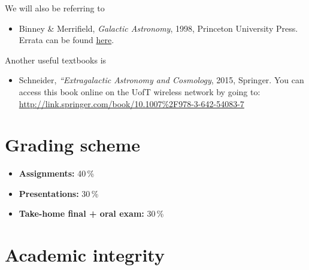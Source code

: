 \documentclass{article}
\begin{document}
We will also be referring to

\begin{itemize}

  \item Binney \& Merrifield, \emph{Galactic Astronomy},
    1998, Princeton University Press. Errata can be found
    \href{http://www-thphys.physics.ox.ac.uk/people/JamesBinney/bmerrors.pdf}{here}.

\end{itemize}

Another useful textbooks is

\begin{itemize}

  \item Schneider, \emph{“Extragalactic Astronomy and Cosmology}, 2015, Springer. You can access this book online on the UofT wireless network by going to:
{\footnotesize \url{http://link.springer.com/book/10.1007%2F978-3-642-54083-7}}

\end{itemize}

\section*{Grading scheme}

\begin{itemize}

  \item {\bf Assignments:} 40\,\%

  \item {\bf Presentations:} 30\,\%

  \item {\bf Take-home final + oral exam:} 30\,\%

\end{itemize}

\section*{Academic integrity}
\end{document}
